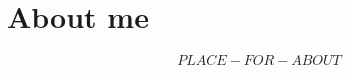 \documentclass[12pt]{article}
\begin{document}
    \section{About me}\label{sec:about_me}
        $$PLACE-FOR-ABOUT$$

\end{document}
